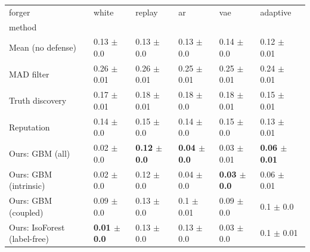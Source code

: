 \begin{tabular}{llllll}
\toprule
forger & white & replay & ar & vae & adaptive \\
method &  &  &  &  &  \\
\midrule
Mean (no defense) & 0.13 $\pm$ 0.0 & 0.13 $\pm$ 0.0 & 0.13 $\pm$ 0.0 & 0.14 $\pm$ 0.0 & 0.12 $\pm$ 0.01 \\
MAD filter & 0.26 $\pm$ 0.01 & 0.26 $\pm$ 0.01 & 0.25 $\pm$ 0.01 & 0.25 $\pm$ 0.01 & 0.24 $\pm$ 0.01 \\
Truth discovery & 0.17 $\pm$ 0.01 & 0.18 $\pm$ 0.01 & 0.18 $\pm$ 0.0 & 0.18 $\pm$ 0.01 & 0.15 $\pm$ 0.01 \\
Reputation & 0.14 $\pm$ 0.0 & 0.15 $\pm$ 0.0 & 0.14 $\pm$ 0.0 & 0.15 $\pm$ 0.0 & 0.13 $\pm$ 0.01 \\
Ours: GBM (all) & 0.02 $\pm$ 0.0 & \textbf{0.12 $\pm$ 0.0} & \textbf{0.04 $\pm$ 0.0} & 0.03 $\pm$ 0.01 & \textbf{0.06 $\pm$ 0.01} \\
Ours: GBM (intrinsic) & 0.02 $\pm$ 0.0 & 0.12 $\pm$ 0.0 & 0.04 $\pm$ 0.0 & \textbf{0.03 $\pm$ 0.0} & 0.06 $\pm$ 0.01 \\
Ours: GBM (coupled) & 0.09 $\pm$ 0.0 & 0.13 $\pm$ 0.0 & 0.1 $\pm$ 0.01 & 0.09 $\pm$ 0.0 & 0.1 $\pm$ 0.0 \\
Ours: IsoForest (label-free) & \textbf{0.01 $\pm$ 0.0} & 0.13 $\pm$ 0.0 & 0.13 $\pm$ 0.0 & 0.03 $\pm$ 0.0 & 0.1 $\pm$ 0.01 \\
\bottomrule
\end{tabular}
